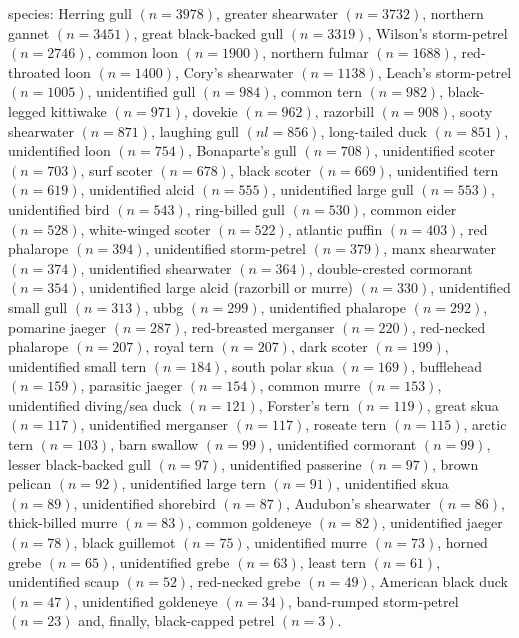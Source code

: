 \documentclass{statsoc}\usepackage[]{graphicx}\usepackage[]{color}
\begin{document}
species: 
Herring gull $(n=3978)$,
greater shearwater $(n=3732)$,
northern gannet $(n=3451)$,
great black-backed gull $(n=3319)$,
Wilson's storm-petrel $(n=2746)$,
common loon $(n=1900)$,
northern fulmar $(n=1688)$,
red-throated loon $(n=1400)$,
Cory's shearwater $(n=1138)$,
Leach's storm-petrel $(n=1005)$,
unidentified gull $(n=984)$,
common tern $(n=982)$,
black-legged kittiwake $(n=971)$,
dovekie $(n=962)$,
razorbill $(n=908)$,
sooty shearwater $(n=871)$,
laughing gull $(nl=856)$,
long-tailed duck $(n=851)$,
unidentified loon $(n=754)$,
Bonaparte's gull $(n=708)$,
unidentified scoter $(n=703)$,
surf scoter $(n=678)$,
black scoter $(n=669)$,
unidentified tern $(n=619)$,
unidentified alcid $(n=555)$,
unidentified large gull $(n=553)$,
unidentified bird $(n=543)$,
ring-billed gull $(n=530)$,
common eider $(n=528)$,
white-winged scoter $(n=522)$,
atlantic puffin $(n=403)$,
red phalarope $(n=394)$,
unidentified storm-petrel $(n=379)$,
manx shearwater $(n=374)$,
unidentified shearwater $(n=364)$,
double-crested cormorant $(n=354)$,
unidentified large alcid (razorbill or murre) $(n=330)$,
unidentified small gull $(n=313)$,
ubbg $(n=299)$,
unidentified phalarope $(n=292)$,
pomarine jaeger $(n=287)$,
red-breasted merganser $(n=220)$,
red-necked phalarope $(n=207)$,
royal tern $(n=207)$,
dark scoter $(n=199)$,
unidentified small tern $(n=184)$,
south polar skua $(n=169)$,
bufflehead $(n=159)$,
parasitic jaeger $(n=154)$,
common murre $(n=153)$,
unidentified diving/sea duck $(n=121)$,
Forster's tern $(n=119)$,
great skua $(n=117)$,
unidentified merganser $(n=117)$,
roseate tern $(n=115)$,
arctic tern $(n=103)$,
barn swallow $(n=99)$,
unidentified cormorant $(n=99)$,
lesser black-backed gull $(n=97)$,
unidentified passerine $(n=97)$,
brown pelican $(n=92)$,
unidentified large tern $(n=91)$,
unidentified skua $(n=89)$,
unidentified shorebird $(n=87)$,
Audubon's shearwater $(n=86)$,
thick-billed murre $(n=83)$,
common goldeneye $(n=82)$,
unidentified jaeger $(n=78)$,
black guillemot $(n=75)$,
unidentified murre $(n=73)$,
horned grebe $(n=65)$,
unidentified grebe $(n=63)$,
least tern $(n=61)$,
unidentified scaup $(n=52)$,
red-necked grebe $(n=49)$,
American black duck $(n=47)$,
unidentified goldeneye $(n=34)$,
band-rumped storm-petrel $(n=23)$ and, finally,
black-capped petrel $(n=3)$.
\end{document}
